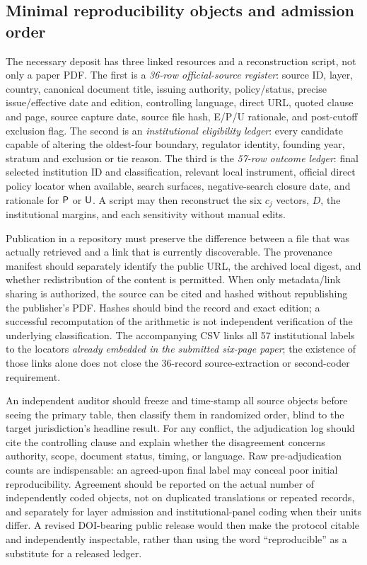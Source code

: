 \subsection{Minimal reproducibility objects and admission order}
The necessary deposit has three linked resources and a reconstruction script, not only a paper PDF. The first is a \emph{36-row official-source register}: source ID, layer, country, canonical document title, issuing authority, policy/status, precise issue/effective date and edition, controlling language, direct URL, quoted clause and page, source capture date, source file hash, E/P/U rationale, and post-cutoff exclusion flag. The second is an \emph{institutional eligibility ledger}: every candidate capable of altering the oldest-four boundary, regulator identity, founding year, stratum and exclusion or tie reason. The third is the \emph{57-row outcome ledger}: final selected institution ID and classification, relevant local instrument, official direct policy locator when available, search surfaces, negative-search closure date, and rationale for $\textsf{P}$ or $\textsf{U}$. A script may then reconstruct the six $c_j$ vectors, $D$, the institutional margins, and each sensitivity without manual edits.

Publication in a repository must preserve the difference between a file that was actually retrieved and a link that is currently discoverable. The provenance manifest should separately identify the public URL, the archived local digest, and whether redistribution of the content is permitted. When only metadata/link sharing is authorized, the source can be cited and hashed without republishing the publisher's PDF. Hashes should bind the record and exact edition; a successful recomputation of the arithmetic is not independent verification of the underlying classification. The accompanying CSV links all 57 institutional labels to the locators \emph{already embedded in the submitted six-page paper}; the existence of those links alone does not close the 36-record source-extraction or second-coder requirement.

An independent auditor should freeze and time-stamp all source objects before seeing the primary table, then classify them in randomized order, blind to the target jurisdiction's headline result. For any conflict, the adjudication log should cite the controlling clause and explain whether the disagreement concerns authority, scope, document status, timing, or language. Raw pre-adjudication counts are indispensable: an agreed-upon final label may conceal poor initial reproducibility. Agreement should be reported on the actual number of independently coded objects, not on duplicated translations or repeated records, and separately for layer admission and institutional-panel coding when their units differ. A revised DOI-bearing public release would then make the protocol citable and independently inspectable, rather than using the word ``reproducible'' as a substitute for a released ledger.

